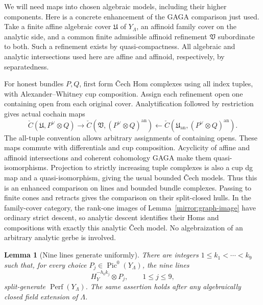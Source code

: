 \documentclass[11pt]{article}
\newtheorem{lemma}[theorem]{Lemma}
\theoremstyle{definition}
\theoremstyle{remark}
\numberwithin{equation}{section}
\begin{document}
We will need maps into chosen algebraic models, including their
higher components.  Here is a concrete enhancement of the GAGA
comparison just used.  Take a finite affine algebraic cover
$\mathfrak U$ of $Y_\Lambda$, an affinoid family cover on the analytic
side, and a common finite admissible affinoid refinement
$\mathfrak V$ subordinate to both.  Such a refinement exists by
quasi-compactness.  All algebraic and analytic intersections used
here are affine and affinoid, respectively, by separatedness.

For honest bundles $P,Q$, first form \v Cech Hom complexes using all
index tuples, with Alexander--Whitney cup composition.  Assign each
refinement open one containing open from each original cover.
Analytification followed by restriction gives actual cochain maps
\[
 \check C(\mathfrak U,P^\vee\otimes Q)
 \longrightarrow
 \check C(\mathfrak V,(P^\vee\otimes Q)^{\mathrm{an}})
 \longleftarrow
 \check C(\mathfrak U_{\mathrm{an}},
                         (P^\vee\otimes Q)^{\mathrm{an}}).
\]
The all-tuple convention allows arbitrary assignments of containing
opens.  These maps commute with differentials and cup composition.
Acyclicity of affine and affinoid intersections and coherent
cohomology GAGA make them quasi-isomorphisms.  Projection to strictly
increasing tuple complexes is also a cup dg map and a
quasi-isomorphism, giving the usual bounded \v Cech models.  Thus
this is an enhanced comparison on lines and bounded bundle
complexes.  Passing to finite cones and retracts gives the comparison
on their split-closed hulls.  In the family-cover category, the
rank-one images of Lemma~\ref{mirror:graph-image} have ordinary strict
descent, so analytic descent identifies their Homs and compositions
with exactly this analytic \v Cech model.  No algebraization of an
arbitrary analytic gerbe is involved.

\begin{lemma}[Nine lines generate uniformly]
\label{mirror:generation}
There are integers $1\leq k_1<\cdots<k_9$ such that, for every
choice $P_j\in\operatorname{Pic}^0(Y_\Lambda)$, the nine lines
\[
 H_Y^{-h_0k_j}\otimes P_j,\qquad 1\leq j\leq9,
\]
split-generate $\operatorname{Perf}(Y_\Lambda)$.  The same assertion holds after
any algebraically closed field extension of $\Lambda$.
\end{lemma}
\end{document}
